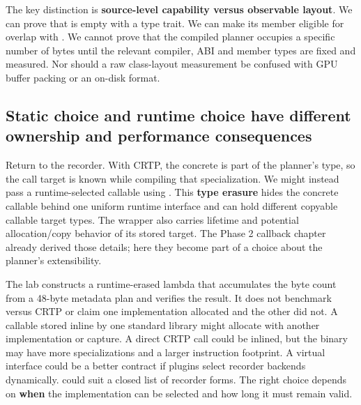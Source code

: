 The key distinction is \textbf{source-level capability versus observable layout}. We can prove that  is empty with a type trait. We can make its member eligible for overlap with . We cannot prove that the compiled planner occupies a specific number of bytes until the relevant compiler, ABI and member types are fixed and measured. Nor should a raw class-layout measurement be confused with GPU buffer packing or an on-disk format.

\subsection{Static choice and runtime choice have different ownership and performance consequences}\label{05-engine-i-ch005-static-choice-and-runtime-choice-have-different-ownership-and-performance-consequences}

\hypertarget{05-engine-i-ch005-static-choice-and-runtime-choice-have-different-ownership-and-performance-consequences}{}

Return to the recorder. With CRTP, the concrete  is part of the planner's type, so the call target is known while compiling that specialization. We might instead pass a runtime-selected callable using . This \textbf{type erasure} hides the concrete callable behind one uniform runtime interface and can hold different copyable callable target types. The wrapper also carries lifetime and potential allocation/copy behavior of its stored target. The Phase 2 callback chapter already derived those details; here they become part of a choice about the planner's extensibility.

The lab constructs a runtime-erased lambda that accumulates the byte count from a 48-byte metadata plan and verifies the result. It does not benchmark  versus CRTP or claim one implementation allocated and the other did not. A callable stored inline by one standard library might allocate with another implementation or capture. A direct CRTP call could be inlined, but the binary may have more specializations and a larger instruction footprint. A virtual interface could be a better contract if plugins select recorder backends dynamically.  could suit a closed list of recorder forms. The right choice depends on \textbf{when} the implementation can be selected and how long it must remain valid.

